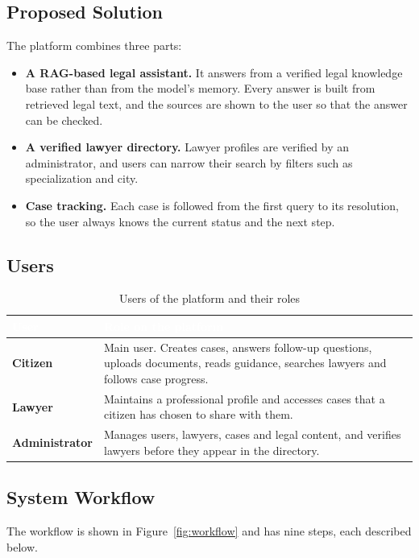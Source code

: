 \documentclass[12pt,a4paper]{report}
\newcommand{\thd}[1]{\textcolor{white}{\textbf{#1}}}
\newcommand{\headrow}{\rowcolor{tablehead}}
\begin{document}
\subsection{Proposed Solution}
The platform combines three parts:
\begin{itemize}
  \item \textbf{A RAG-based legal assistant.} It answers from a verified legal knowledge base rather than from the model's memory. Every answer is built from retrieved legal text, and the sources are shown to the user so that the answer can be checked.
  \item \textbf{A verified lawyer directory.} Lawyer profiles are verified by an administrator, and users can narrow their search by filters such as specialization and city.
  \item \textbf{Case tracking.} Each case is followed from the first query to its resolution, so the user always knows the current status and the next step.
\end{itemize}

\subsection{Users}
\begin{table}[H]
\centering
\caption{Users of the platform and their roles}
\label{tab:users}
\begin{tabular}{|L{3.6cm}|L{10.4cm}|}
\hline
\headrow \thd{User} & \thd{Role on the platform} \\ \hline
\textbf{Citizen} & Main user. Creates cases, answers follow-up questions, uploads documents, reads guidance, searches lawyers and follows case progress. \\ \hline
{}\textbf{Lawyer} & Maintains a professional profile and accesses cases that a citizen has chosen to share with them. \\ \hline
\textbf{Administrator} & Manages users, lawyers, cases and legal content, and verifies lawyers before they appear in the directory. \\ \hline
\end{tabular}
\end{table}

\subsection{System Workflow}
The workflow is shown in Figure~\ref{fig:workflow} and has nine steps, each described below.
\end{document}
